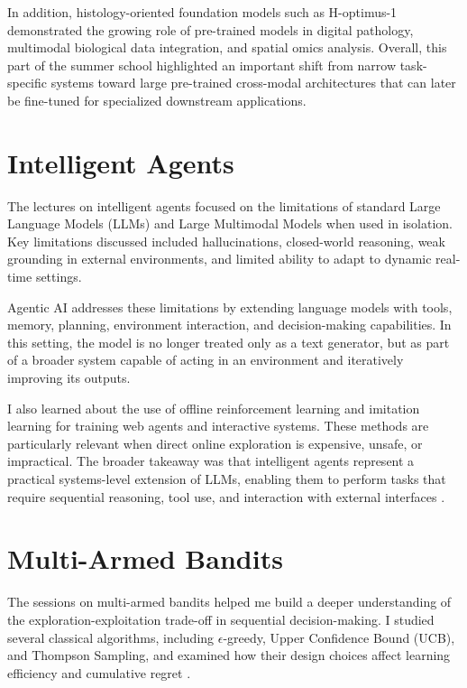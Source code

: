 \documentclass[11pt,a4paper]{article}
\begin{document}
In addition, histology-oriented foundation models such as H-optimus-1 demonstrated the growing role of pre-trained models in digital pathology, multimodal biological data integration, and spatial omics analysis. Overall, this part of the summer school highlighted an important shift from narrow task-specific systems toward large pre-trained cross-modal architectures that can later be fine-tuned for specialized downstream applications.

\section{Intelligent Agents}
The lectures on intelligent agents focused on the limitations of standard Large Language Models (LLMs) and Large Multimodal Models when used in isolation. Key limitations discussed included hallucinations, closed-world reasoning, weak grounding in external environments, and limited ability to adapt to dynamic real-time settings.

Agentic AI addresses these limitations by extending language models with tools, memory, planning, environment interaction, and decision-making capabilities. In this setting, the model is no longer treated only as a text generator, but as part of a broader system capable of acting in an environment and iteratively improving its outputs.

I also learned about the use of offline reinforcement learning and imitation learning for training web agents and interactive systems. These methods are particularly relevant when direct online exploration is expensive, unsafe, or impractical. The broader takeaway was that intelligent agents represent a practical systems-level extension of LLMs, enabling them to perform tasks that require sequential reasoning, tool use, and interaction with external interfaces \cite{wang2023agents}.

\section{Multi-Armed Bandits}
The sessions on multi-armed bandits helped me build a deeper understanding of the exploration-exploitation trade-off in sequential decision-making. I studied several classical algorithms, including $\epsilon$-greedy, Upper Confidence Bound (UCB), and Thompson Sampling, and examined how their design choices affect learning efficiency and cumulative regret \cite{lattimore2020bandit}.
\end{document}

